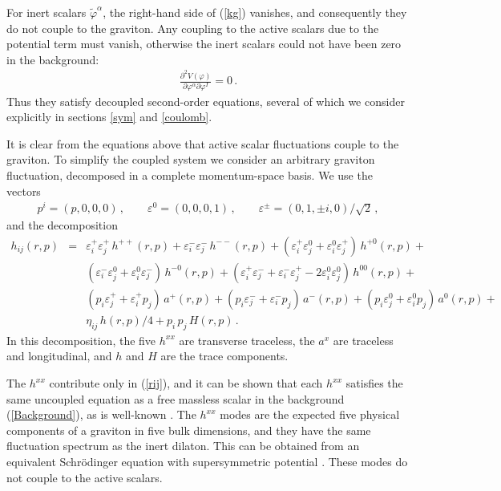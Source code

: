 \documentclass[a4paper,12pt]{article}
\def\varphit{\tilde{\varphi}}
\begin{document}
For inert scalars $\varphit^{\alpha}$, the right-hand side of
(\ref{kg}) vanishes, and consequently they do not couple to the
graviton.  Any coupling to the active scalars due to the potential
term must vanish, otherwise the inert scalars could not have been zero
in the background:
\begin{eqnarray}
\frac{\partial^2 V(\varphi)}{\partial \varphi^{\alpha} \partial
\varphi^I} = 0 \,.
\end{eqnarray}
Thus they satisfy decoupled second-order equations, several of which we consider
explicitly in sections \ref{sym} and \ref{coulomb}.

It is clear from the equations above that active scalar fluctuations couple 
to the graviton. To simplify the coupled system 
we consider an arbitrary graviton fluctuation, decomposed in
a complete momentum-space basis.  We use the vectors
\begin{eqnarray}
p^i = (p, 0, 0, 0) \,, \quad \quad \varepsilon^0 = (0,0,0,1) \,, \quad \quad \varepsilon^{\pm} = (0, 1, \pm i, 0) / \sqrt{2} \,,
\end{eqnarray}
and the decomposition
\begin{eqnarray}
h_{ij}(r,p) &=& \varepsilon_i^+ \varepsilon_j^+ \, h^{++}(r,p) +
\varepsilon_i^- \varepsilon_j^- \, h^{--}(r,p) + (\varepsilon_i^+
\varepsilon_j^0 + \varepsilon_i^0 \varepsilon_j^+) \, h^{+0}(r,p) +
\nonumber \\ && (\varepsilon_i^- \varepsilon_j^0 + \varepsilon_i^0
\varepsilon_j^-) \, h^{-0}(r,p) + (\varepsilon_i^+ \varepsilon_j^- +
\varepsilon_i^- \varepsilon_j^+ - 2 \varepsilon_i^0 \varepsilon_j^0)
\, h^{00}(r,p) + \\ && (p_i \varepsilon_j^+ + \varepsilon_i^+ p_j) \,
a^+(r,p) + (p_i \varepsilon_j^- + \varepsilon_i^- p_j) \, a^-(r,p) + (p_i
\varepsilon_j^0 + \varepsilon_i^0 p_j) \, a^0(r,p) + \nonumber \\&&
 \eta_{ij} \, h(r,p) / 4 + p_i \, p_j \, H(r,p) \,.  \nonumber
\end{eqnarray}
In this decomposition, the five $h^{xx}$ are transverse traceless, the
$a^x$ are traceless and longitudinal, and $h$ and $H$ are the trace
components.

The $h^{xx}$ contribute only in (\ref{rij}), and it can be shown that
each $h^{xx}$ satisfies the same uncoupled equation as a free massless
scalar in the background (\ref{Background}), as is well-known
\cite{dfgk, bs2, glueball}. The $h^{xx}$ modes are the expected five physical
components of a graviton in five bulk dimensions, and they have the
same fluctuation spectrum as the inert dilaton. This can be obtained
from an equivalent Schr\"odinger equation with supersymmetric
potential \cite{dfgk}.  These modes do not couple to the active
scalars.
\end{document}
